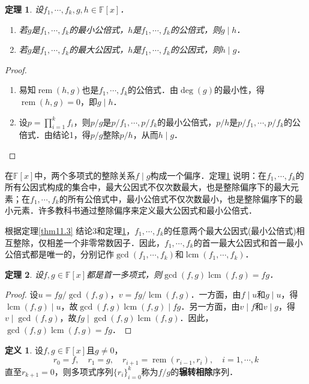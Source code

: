 \documentclass[a4paper,fontset=windows]{ctexbook}
\newtheorem{theorem}{定理}[chapter]
\theoremstyle{definition}
\newtheorem{definition}{定义}[chapter]
\DeclareMathOperator{\lcm}{lcm}
\DeclareMathOperator{\rem}{rem}
\begin{document}
\begin{theorem}\label{thm11.4}
设$f_1,\cdots,f_k,g,h\in\mathbb{F}[x]$．
\begin{enumerate}
\item 若$g$是$f_1,\cdots,f_k$的最小公倍式，$h$是$f_1,\cdots,f_k$的公倍式，则$g\mid h$．

\item 若$g$是$f_1,\cdots,f_k$的最大公因式，$h$是$f_1,\cdots,f_k$的公因式，则$h\mid g$．
\end{enumerate}
\end{theorem}

\begin{proof}~
\begin{enumerate}
\item 易知$\rem(h,g)$也是$f_1,\cdots,f_k$的公倍式．由$\deg(g)$的最小性，得$\rem(h,g)=0$，即$g\mid h$．

\item 设$p=\prod\limits_{i=1}^kf_i$，则$p/g$是$p/f_1,\cdots,p/f_k$的最小公倍式，$p/h$是$p/f_1,\cdots,p/f_k$的公倍式．\linebreak 由结论1，得$p/g$整除$p/h$，从而$h\mid g$．\qedhere
\end{enumerate}
\end{proof}

在$\mathbb{F}[x]$中，两个多项式的整除关系$f\mid g$构成一个偏序．定理\ref{thm11.4} 说明：在$f_1,\cdots,f_k$的所有公因式构成的集合中，最大公因式不仅次数最大，也是整除偏序下的最大元素；在$f_1,\cdots,f_k$的所有公倍式中，最小公倍式不仅次数最小，也是整除偏序下的最小元素．许多教科书通过整除偏序来定义最大公因式和最小公倍式．

根据定理\ref{thm11.3} 结论3和定理\ref{thm11.4}，$f_1,\cdots,f_k$的任意两个最大公因式(最小公倍式)相互整除，仅相差一个非零常数因子．因此，$f_1,\cdots,f_k$的首一最大公因式和首一最小公倍式都是唯一的，分别记作$\gcd(f_1,\cdots,f_k)$和$\lcm(f_1,\cdots,f_k)$．

\begin{theorem}
设$f,g\in\mathbb{F}[x]$都是首一多项式，则$\gcd(f,g)\lcm(f,g)=fg$．
\end{theorem}

\begin{proof}
设$u=fg/\gcd(f,g)$，$v=fg/\lcm(f,g)$．一方面，由$f\mid u$和$g\mid u$，得$\lcm(f,g)\mid u$，故$\gcd(f,g)\lcm(f,g)\mid fg$．另一方面，由$v\mid f$和$v\mid g$，得$v\mid\gcd(f,g)$，故$fg\mid\gcd(f,g)\lcm(f,g)$．因此，$\gcd(f,g)\lcm(f,g)=fg$．
\end{proof}

\begin{definition}\label{def11.5}
设$f,g\in\mathbb{F}[x]$且$g\ne 0$，
\begin{equation}\label{eq11.2}
r_0=f,\quad r_1=g,\quad r_{i+1}=\rem(r_{i-1},r_i),\quad i=1,\cdots,k
\end{equation}
直至$r_{k+1}=0$，则多项式序列$\{r_i\}_{i=0}^k$称为$f/g$的{\bf 辗转相除}序列．
\end{definition}
\end{document}
